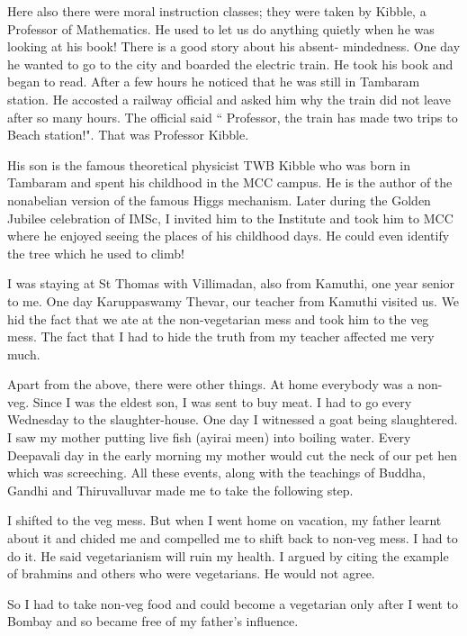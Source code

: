 Here also there were moral instruction classes; they were taken by 
Kibble, a Professor of Mathematics. He used to let us do anything 
quietly when he was looking at his book! There is a good story about his 
absent- mindedness. One day he wanted to go to the city and boarded the 
electric train. He took his book and began to read. After a few hours he 
noticed that he was still in Tambaram station. He accosted a railway 
official and asked him why the train did not leave after so many hours. 
The official said `` Professor, the train has made two trips to Beach 
station!". That was Professor Kibble.
\smallskip
 
His son is the famous theoretical physicist TWB Kibble who was born in 
Tambaram and spent his childhood in the MCC campus. He is the author of 
the nonabelian version of the famous Higgs mechanism. Later during the 
Golden Jubilee celebration of IMSc, I invited him to the Institute and 
took him to MCC where he enjoyed seeing the places of his childhood 
days. He could even identify the tree which he used to climb!
\smallskip
  
I was staying at St Thomas with Villimadan, also from Kamu\-thi, one year 
senior to me. One day Karuppaswamy Thevar, our teacher from Kamuthi 
visited us. We hid the fact that we ate at the non-vegetarian mess and 
took him to the veg mess. The fact that I had to hide the truth from my 
teacher affected me very much.
\smallskip

Apart from the above, there were other things. At home every\-body was a 
non-veg. Since I was the eldest son, I was sent to buy meat. I had to go 
every Wednesday to the slaughter-house. One day I witnessed a goat being 
slaughtered. I saw my mother putting live fish (ayirai meen) into 
boiling water. Every Deepavali day in the early morning my mother would 
cut the neck of our pet hen which was screeching. All these events, 
along with the teachings of Buddha, Gandhi and Thiruvalluvar made me to 
take the following step.
\smallskip

I shifted to the veg mess. But when I went home on vacation, my father 
learnt about it and chided me and compelled me to shift back to non-veg 
mess. I had to do it. He said vegetarianism will ruin my health. I 
argued by citing the example of brahmins and others who were 
vegetarians. He would not agree.
\smallskip

So I had to take non-veg food and could become a vegetarian only after I 
went to Bombay and so became free of my father's influence.
\smallskip
 
